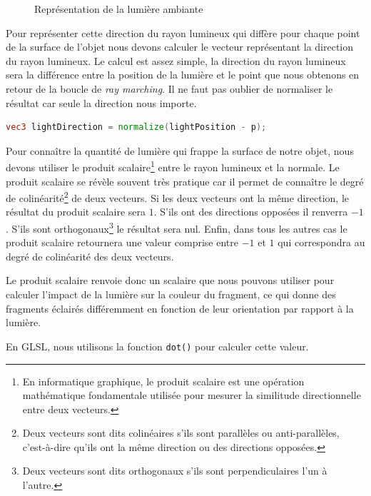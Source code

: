 \begin{figure}[h]
\begin{minipage}[b]{0.45\linewidth}
    \caption{Représentation de la lumière ambiante}
    \label{ambiant00}
  \end{minipage}
\end{figure}

Pour représenter cette direction du rayon lumineux qui diffère pour chaque point de la surface de l'objet nous devons calculer le vecteur représentant la direction du rayon lumineux. Le calcul est assez simple, la direction du rayon lumineux sera la différence entre la position de la lumière et le point que nous obtenons en retour de la boucle de  \textit{ray marching}. Il ne faut pas oublier de normaliser le résultat car seule la direction nous importe.

\begin{minipage}{\linewidth}
\begin{lstlisting}[language=GLSL, caption=Direction de la lumière,captionpos=b,frame=single]
vec3 lightDirection = normalize(lightPosition - p);
\end{lstlisting}
\end{minipage}

Pour connaître la quantité de lumière qui frappe la surface de notre objet, nous devons utiliser le produit scalaire\footnote{En informatique graphique, le produit scalaire est une opération mathématique fondamentale utilisée pour mesurer la similitude directionnelle entre deux vecteurs.} entre le rayon lumineux et la normale. Le produit scalaire se révèle souvent très pratique car il permet de connaître le degré de colinéarité\footnote{Deux vecteurs sont dits colinéaires s'ils sont parallèles ou anti-parallèles, c'est-à-dire qu'ils ont la même direction ou des directions opposées.} de deux vecteurs. Si les deux vecteurs ont la même direction, le résultat du produit scalaire sera $1$. S'ils ont des directions opposées il renverra $-1$. S'ils sont orthogonaux\footnote{Deux vecteurs sont dits orthogonaux s'ils sont perpendiculaires l'un à l'autre.} le résultat sera nul. Enfin, dans tous les autres cas le produit scalaire retournera une valeur comprise entre $-1$ et $1$ qui correspondra au degré de colinéarité des deux vecteurs.

Le produit scalaire renvoie donc un scalaire que nous pouvons utiliser pour calculer l'impact de la lumière sur la couleur du fragment, ce qui donne des fragments éclairés différemment en fonction de leur orientation par rapport à la lumière.

En GLSL, nous utilisons la fonction \lstinline{dot()} pour calculer cette valeur.

